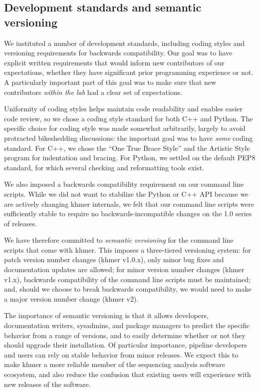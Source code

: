 \documentclass[12pt]{article}
\begin{document}
\subsection{Development standards and semantic versioning}

We instituted a number of development standards, including coding
styles and versioning requirements for backwards compatibility.  Our
goal was to have explicit written requirements that would inform new
contributors of our expectations, whether they have significant prior
programming experience or not.  A particularly important part of this
goal was to make sure that new contributors {\em within the lab} had
a clear set of expectations.

Uniformity of coding styles helps maintain code readability and
enables easier code review, so we chose a coding style standard for
both C++ and Python. The specific choice for coding style was made
somewhat arbitrarily, largely to avoid protracted bikeshedding
discussions: the important goal was to have {\em some} coding
standard. For C++, we chose the ``One True Brace Style'' and the
Artistic Style program for indentation and bracing.  For Python, we
settled on the default PEP8 standard, for which several checking and
reformatting tools exist.

We also imposed a backwards compatibility requirement on our command
line scripts.  While we did not want to stabilize the Python or C++
API because we are actively changing khmer internals, we felt that our
command line scripts were sufficiently stable to require no
backwards-incompatible changes on the 1.0 series of releases.

We have therefore committed to {\em semantic versioning}\cite{semver} for the
command line scripts that come with khmer.  This imposes a
three-tiered versioning system: for patch version number changes
(khmer v1.0.x), only minor bug fixes and documentation updates are
allowed; for minor version number changes (khmer v1.x), backwards
compatibility of the command line scripts must be maintained; and,
should we choose to break backwards compatibility, we would need to
make a major version number change (khmer v2).

The importance of semantic versioning is that it allows developers,
documentation writers, sysadmins, and package managers to predict the
specific behavior from a range of versions, and to easily determine
whether or not they should upgrade their installation.  Of particular
importance, pipeline developers and users can rely on stable behavior
from minor releases.  We expect this to make khmer a more reliable
member of the sequencing analysis software ecosystem, and also reduce
the confusion that existing users will experience with new releases of
the software.
\end{document}
